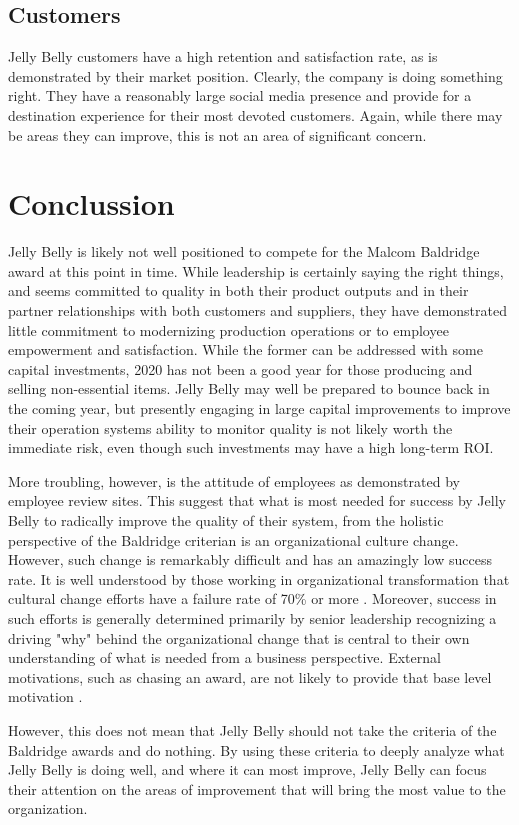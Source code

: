 \documentclass[man]{apa7}
\begin{document}
\subsection{Customers}
\label{sec:orgfc293ed}

Jelly Belly customers have a high retention and satisfaction rate, as is demonstrated by their market position. Clearly, the company is doing something right.  They have a reasonably large social media presence and provide for a destination experience for their most devoted customers. Again, while there may be areas they can improve, this is not an area of significant concern.

\section{Conclussion}
\label{sec:org6e656b4}

Jelly Belly is likely not well positioned to compete for the Malcom Baldridge award at this point in time. While leadership is certainly saying the right things, and seems committed to quality in both their product outputs and in their partner relationships with both customers and suppliers, they have demonstrated little commitment to modernizing production operations or to employee empowerment and satisfaction. While the former can be addressed with some capital investments, 2020 has not been a good year for those producing and selling non-essential items. Jelly Belly may well be prepared to bounce back in the coming year, but presently engaging in large capital improvements to improve their operation systems ability to monitor quality is not likely worth the immediate risk, even though such investments may have a high long-term ROI.

More troubling, however, is the attitude of employees as demonstrated by employee review sites. This suggest that what is most needed for success by Jelly Belly to radically improve the quality of their system, from the holistic perspective of the Baldridge criterian is an organizational culture change. However, such change is remarkably difficult and has an amazingly low success rate. It is well understood by those working in organizational transformation that cultural change efforts have a failure rate of 70\% or more \parencite{burnesSuccessFailureOrganizational2011}. Moreover, success in such efforts is generally determined primarily by senior leadership recognizing a driving "why" behind the organizational change that is central to their own understanding of what is needed from a business perspective. External motivations, such as chasing an award, are not likely to provide that base level motivation \parencite{kotterLeadingChange2012}.

However, this does not mean that Jelly Belly should not take the criteria of the Baldridge awards and do nothing. By using these criteria to deeply analyze what Jelly Belly is doing well, and where it can most improve, Jelly Belly can focus their attention on the areas of improvement that will bring the most value to the organization.

\printbibliography
\end{document}
